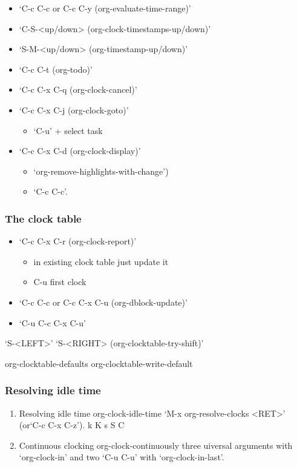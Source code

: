 \documentclass[11pt]{article}
\begin{document}
\begin{itemize}
\item ‘C-c C-c  or  C-c C-y     (org-evaluate-time-range)’
\item ‘C-S-<up/down>     (org-clock-timestamps-up/down)’
\item ‘S-M-<up/down>     (org-timestamp-up/down)’
\item ‘C-c C-t     (org-todo)’
\item ‘C-c C-x C-q     (org-clock-cancel)’
\item ‘C-c C-x C-j     (org-clock-goto)’
\begin{itemize}
\item ‘C-u’ + select task
\end{itemize}
\item ‘C-c C-x C-d     (org-clock-display)’
\begin{itemize}
\item ‘org-remove-highlights-with-change’)
\item ‘C-c C-c’.
\end{itemize}
\end{itemize}
\subsubsection{The clock table}
\label{sec:org3d67950}
\begin{itemize}
\item ‘C-c C-x C-r     (org-clock-report)’
\begin{itemize}
\item in existing clock table just update it
\item C-u first clock
\end{itemize}
\item ‘C-c C-c  or  C-c C-x C-u     (org-dblock-update)’
\item ‘C-u C-c C-x C-u’
\end{itemize}
‘S-<LEFT>’
‘S-<RIGHT>     (org-clocktable-try-shift)’

org-clocktable-defaults
org-clocktable-write-default
\subsubsection{Resolving idle time}
\label{sec:orge362076}
\begin{enumerate}
\item Resolving idle time
\label{sec:orgf47cbaa}
 org-clock-idle-time
‘M-x org-resolve-clocks <RET>’ (or‘C-c C-x C-z’).
k K s S C
\item Continuous clocking
\label{sec:orge9e4da5}
org-clock-continuously
three uiversal arguments with ‘org-clock-in’ and 
two ‘C-u C-u’ with ‘org-clock-in-last’.
\end{enumerate}
\end{document}
